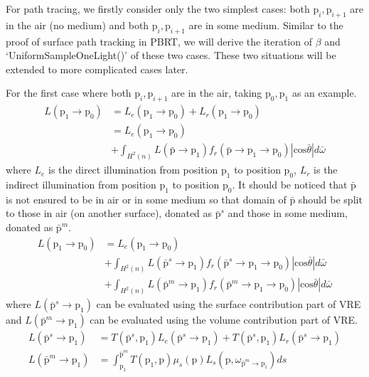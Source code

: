 \documentclass[acmtog]{acmart}
\def\w{\omega}
\def\p{\mathrm{p}}
\def\pp#1#2{\p_{#1}\rightarrow\p_{#2}}
\begin{document}
For path tracing, we firstly consider only the two simplest cases: 
both $\p_i,\p_{i+1}$ are in the air (no medium) and both $\p_i,\p_{i+1}$ are in some medium.
Similar to the proof of surface path tracking in PBRT, we will derive the iteration of $\beta$ and `UniformSampleOneLight()' of these two cases.
These two situations will be extended to more complicated cases later.\par
For the first case where both $\p_i,\p_{i+1}$ are in the air, taking $\p_0,\p_1$ as an example.
\begin{equation} \label{eq4}
	\begin{split}
		L(\pp{1}{0}) &= L_e(\pp{1}{0}) + L_r(\pp{1}{0})\\
		&= L_e(\pp{1}{0})\\
		&+ \int_{H^2(n)}L(\bar{\p}\rightarrow\p_1)f_r(\bar{\p}\rightarrow\p_1\rightarrow\p_0)|\mathrm{cos}\bar{\theta}|d\bar{\w}
	\end{split}
\end{equation}
where $L_e$ is the direct illumination from position $\p_1$ to position $\p_0$, 
$L_r$ is the indirect illumination from position $\p_1$ to position $\p_0$.
It should be noticed that $\bar{\p}$ is not ensured to be in air or in some medium so that 
domain of $\bar{\p}$ should be split to those in air (on another surface), donated as $\bar{\p}^s$ and those in some medium, donated as $\bar{\p}^m$.
\begin{equation} \label{eq5}
	\begin{split}
		L(\pp{1}{0}) &= L_e(\pp{1}{0})\\
		&+ \int_{H^2(n)}L(\bar{\p}^s\rightarrow\p_1)f_r(\bar{\p}^s\rightarrow\p_1\rightarrow\p_0)|\mathrm{cos}\bar{\theta}|d\bar{\w}\\
		&+ \int_{H^2(n)}L(\bar{\p}^m\rightarrow\p_1)f_r(\bar{\p}^m\rightarrow\p_1\rightarrow\p_0)|\mathrm{cos}\bar{\theta}|d\bar{\w}
	\end{split}
\end{equation}
where $L(\bar{\p}^s\rightarrow\p_1)$ can be evaluated using the surface contribution part of VRE and 
$L(\bar{\p}^m\rightarrow\p_1)$ can be evaluated using the volume contribution part of VRE.
\begin{equation} \label{eq6}
	\begin{split}
		L(\bar{\p}^s\rightarrow\p_1) &= T(\bar{\p}^s,\p_1)L_e(\bar{\p}^s\rightarrow\p_1)+T(\bar{\p}^s,\p_1)L_r(\bar{\p}^s\rightarrow\p_1)\\
		L(\bar{\p}^m\rightarrow\p_1) &= \int_{\p_1}^{\bar{\p}^m}T(\p_1,\p)\mu_s(\p)L_s(\p,\w_{\bar{\p}^m\rightarrow\p_1})ds
	\end{split}
\end{equation}
\end{document}
